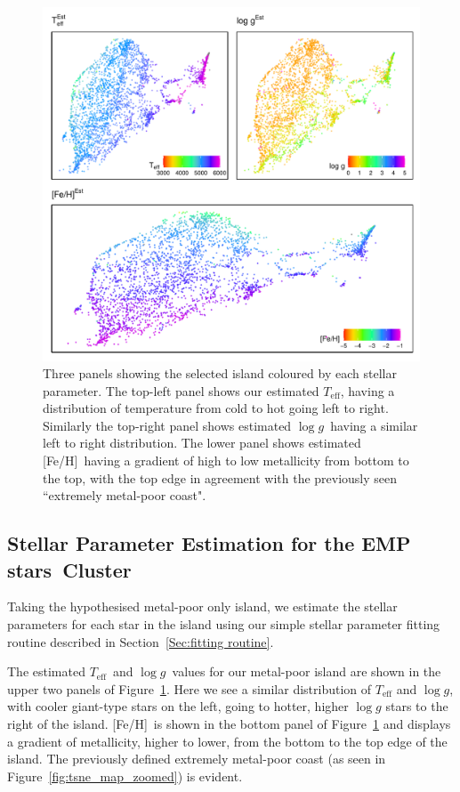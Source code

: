 \documentclass[]{aastex631}
\newcommand{\emps}{EMP stars\xspace}
\newcommand{\logg}{\ensuremath{\log g}\xspace}
\newcommand{\teff}{\ensuremath{T_{\mathrm{eff}}}\xspace}
\newcommand{\feh}{[Fe/H]\xspace}
\begin{document}
\begin{figure}
\includegraphics[width=\linewidth,keepaspectratio]{Plots/Figure6.pdf}
\caption{Three panels showing the selected island coloured by each stellar parameter. The top-left panel shows our estimated \teff, having a distribution of temperature from cold to hot going left to right. Similarly the top-right panel shows estimated \logg \ having a similar left to right distribution. The lower panel shows estimated \feh \ having a gradient of high to low metallicity from bottom to the top, with the top edge in agreement with the previously seen ``extremely metal-poor coast". }
\label{fig:estimate_elephants}
\end{figure}




\subsection{Stellar Parameter Estimation for the \emps \ Cluster }\label{Sec:Estimating stellar parameters of the cluster}
Taking the hypothesised metal-poor only island, we estimate the stellar parameters for each star in the island using our simple stellar parameter fitting routine described in Section~\ref{Sec:fitting routine}.

The estimated \teff \ and \logg \ values for our  metal-poor island are shown in the upper two panels of Figure~\ref{fig:estimate_elephants}. Here we see a similar distribution of \teff and \logg, with cooler giant-type stars on the left, going to hotter, higher \logg stars to the right of the island.
\feh \ is shown in the bottom panel of Figure~\ref{fig:estimate_elephants} and displays a gradient of metallicity, higher to lower, from the bottom to the top edge of the island. The previously defined extremely metal-poor coast (as seen in Figure~\ref{fig:tsne_map_zoomed}) is evident. 
\end{document}
